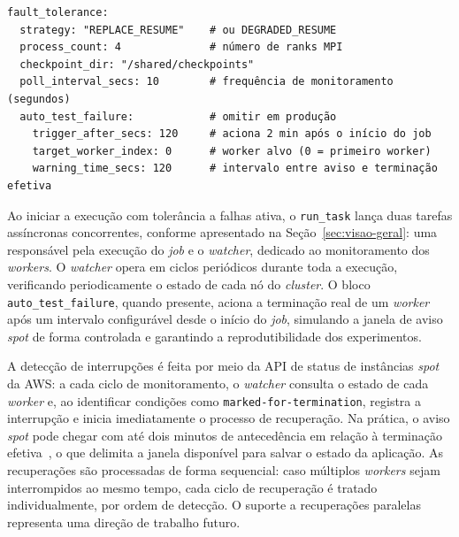 \begin{listing}[htb]
  \caption{Configuração de tolerância a falhas com injeção sintética de interrupção \textit{spot}.}
  \label{lst:ft-yaml}
  \begin{verbatim}
fault_tolerance:
  strategy: "REPLACE_RESUME"    # ou DEGRADED_RESUME
  process_count: 4              # número de ranks MPI
  checkpoint_dir: "/shared/checkpoints"
  poll_interval_secs: 10        # frequência de monitoramento (segundos)
  auto_test_failure:            # omitir em produção
    trigger_after_secs: 120     # aciona 2 min após o início do job
    target_worker_index: 0      # worker alvo (0 = primeiro worker)
    warning_time_secs: 120      # intervalo entre aviso e terminação efetiva
  \end{verbatim}
\end{listing}

Ao iniciar a execução com tolerância a falhas ativa, o \texttt{run\_task} lança duas
tarefas assíncronas concorrentes, conforme apresentado na Seção~\ref{sec:visao-geral}:
uma responsável pela execução do \textit{job} e o \textit{watcher}, dedicado ao monitoramento dos
\textit{workers}. O \textit{watcher} opera em ciclos periódicos durante toda a execução, verificando
periodicamente o estado de cada nó do \textit{cluster}. O bloco \texttt{auto\_test\_failure},
quando presente, aciona a terminação real de um \textit{worker} após um intervalo configurável
desde o início do \textit{job}, simulando a janela de aviso \textit{spot} de forma controlada e
garantindo a reprodutibilidade dos experimentos.

A detecção de interrupções é feita por meio da \gls{API} de status de instâncias \textit{spot}
da \gls{AWS}: a cada ciclo de monitoramento, o \textit{watcher} consulta o estado de cada
\textit{worker} e, ao identificar condições como \texttt{marked-for-termination}, registra a
interrupção e inicia imediatamente o processo de recuperação. Na prática, o aviso \textit{spot}
pode chegar com até dois minutos de antecedência em relação à terminação
efetiva~\cite{aws2026spot_termination}, o que delimita a janela disponível para salvar
o estado da aplicação. As recuperações são processadas de forma sequencial: caso
múltiplos \textit{workers} sejam interrompidos ao mesmo tempo, cada ciclo de recuperação é
tratado individualmente, por ordem de detecção. O suporte a recuperações paralelas
representa uma direção de trabalho futuro.

